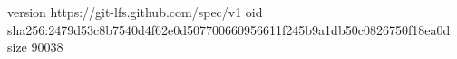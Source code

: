 version https://git-lfs.github.com/spec/v1
oid sha256:2479d53c8b7540d4f62e0d507700660956611f245b9a1db50c0826750f18ea0d
size 90038
